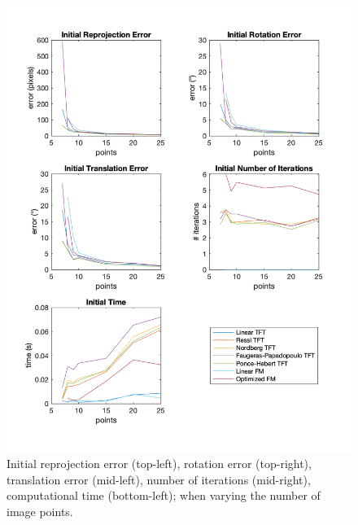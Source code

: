 \begin{figure}[p]
	\centering
	\includegraphics[width=1\textwidth]{Experiments/Synthetic/points/INITpointsPlots.png}
	\caption{Initial reprojection error (top-left), rotation error (top-right), translation error (mid-left), number of iterations (mid-right), computational time (bottom-left); when varying the number of image points.}
	\label{fig:initPointsPlot}
\end{figure}

